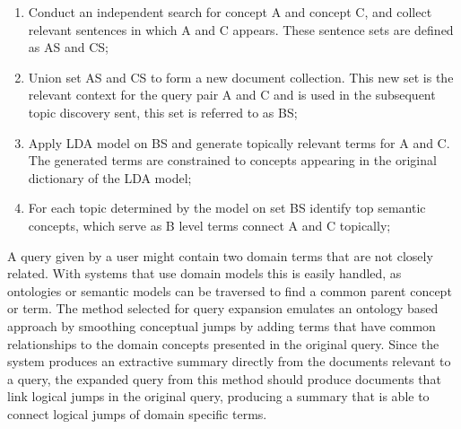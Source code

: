 \begin{enumerate}
    \item Conduct an independent search for concept A and concept C, and collect relevant sentences in which A and C appears. These sentence sets are defined as AS and CS;
    \item Union set AS and CS to form a new document collection. This new set is the relevant context for the query pair A and C and is used in the subsequent topic discovery sent, this set is referred to as BS;
    \item Apply LDA model on BS and generate topically relevant terms for A and C. The generated terms are constrained to concepts appearing in the original dictionary of the LDA model;
    \item For each topic determined by the model on set BS identify top semantic concepts, which serve as B level terms connect A and C topically;
\end{enumerate}

A query given by a user might contain two domain terms that are not closely related. With systems that use domain models this is easily handled, as ontologies or semantic models can be traversed to find a common parent concept or term. The method selected for query expansion emulates an ontology based approach by smoothing conceptual jumps by adding terms that have common relationships to the domain concepts presented in the original query. Since the system produces an extractive summary directly from the documents relevant to a query, the expanded query from this method should produce documents that link logical jumps in the original query, producing a summary that is able to connect logical jumps of domain specific terms. 

